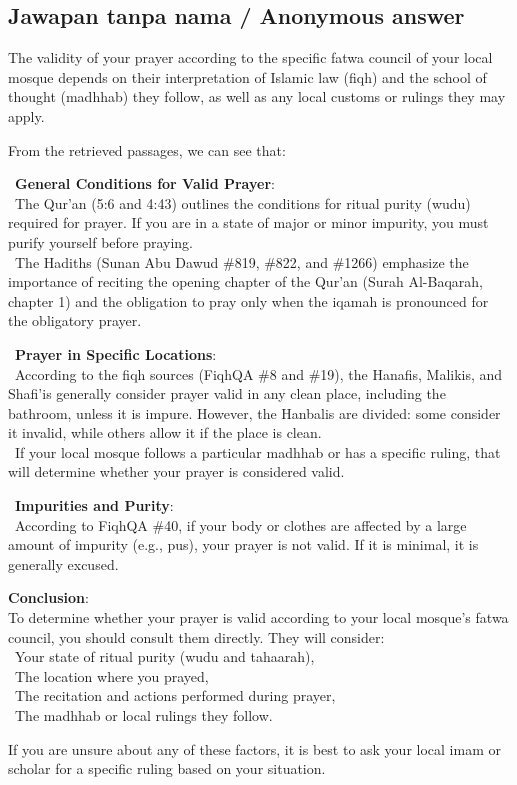 \documentclass[11pt,a4paper]{article}
\begin{document}
\subsection*{Jawapan tanpa nama / Anonymous answer}
The validity of your prayer according to the specific fatwa council of your local mosque depends on their interpretation of Islamic law (fiqh) and the school of thought (madhhab) they follow, as well as any local customs or rulings they may apply.\par\medskip From the retrieved passages, we can see that:\par\medskip \textbullet\ \textbf{General Conditions for Valid Prayer}:\\ \textbullet\ The Qur’an (5:6 and 4:43) outlines the conditions for ritual purity (wudu) required for prayer. If you are in a state of major or minor impurity, you must purify yourself before praying.\\ \textbullet\ The Hadiths (Sunan Abu Dawud \#819, \#822, and \#1266) emphasize the importance of reciting the opening chapter of the Qur’an (Surah Al-Baqarah, chapter 1) and the obligation to pray only when the iqamah is pronounced for the obligatory prayer.\par\medskip \textbullet\ \textbf{Prayer in Specific Locations}:\\ \textbullet\ According to the fiqh sources (FiqhQA \#8 and \#19), the Hanafis, Malikis, and Shafi'is generally consider prayer valid in any clean place, including the bathroom, unless it is impure. However, the Hanbalis are divided: some consider it invalid, while others allow it if the place is clean.\\ \textbullet\ If your local mosque follows a particular madhhab or has a specific ruling, that will determine whether your prayer is considered valid.\par\medskip \textbullet\ \textbf{Impurities and Purity}:\\ \textbullet\ According to FiqhQA \#40, if your body or clothes are affected by a large amount of impurity (e.g., pus), your prayer is not valid. If it is minimal, it is generally excused.\par\medskip \textbf{Conclusion}:\\ To determine whether your prayer is valid according to your local mosque’s fatwa council, you should consult them directly. They will consider:\\ \textbullet\ Your state of ritual purity (wudu and tahaarah),\\ \textbullet\ The location where you prayed,\\ \textbullet\ The recitation and actions performed during prayer,\\ \textbullet\ The madhhab or local rulings they follow.\par\medskip If you are unsure about any of these factors, it is best to ask your local imam or scholar for a specific ruling based on your situation.
\end{document}
